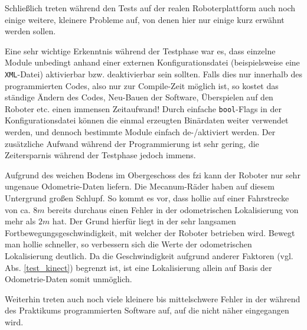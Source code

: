 Schließlich treten während den Tests auf der realen Roboterplattform auch noch einige weitere, kleinere Probleme auf, von denen hier nur einige kurz erwähnt werden sollen.

Eine sehr wichtige Erkenntnis während der Testphase war es, dass einzelne Module unbedingt anhand einer externen Konfigurationsdatei (beispielsweise eine \lstinline{XML}-Datei) aktivierbar bzw. deaktivierbar sein sollten.
Falls dies nur innerhalb des programmierten Codes, also nur zur Compile-Zeit möglich ist, so kostet das ständige Ändern des Codes, Neu-Bauen der Software, Überspielen auf den Roboter etc. einen immensen Zeitaufwand!
Durch einfache \lstinline{bool}-Flags in der Konfigurationsdatei können die einmal erzeugten Binärdaten weiter verwendet werden, und dennoch bestimmte Module einfach de-/aktiviert werden.
Der zusätzliche Aufwand während der Programmierung ist sehr gering, die Zeitersparnis während der Testphase jedoch immens.

Aufgrund des weichen Bodens im Obergeschoss des \gls{fzi} kann der Roboter nur sehr ungenaue Odometrie-Daten liefern.
Die Mecanum-Räder haben auf diesem Untergrund großen Schlupf.
So kommt es vor, dass \gls{hollie} auf einer Fahrstrecke von ca. $8m$ bereits durchaus einen Fehler in der odometrischen Lokalisierung von mehr als $2m$ hat.
Der Grund hierfür liegt in der sehr langsamen Fortbewegungsgeschwindigkeit, mit welcher der Roboter betrieben wird.
Bewegt man \gls{hollie} schneller, so verbessern sich die Werte der odometrischen Lokalisierung deutlich.
Da die Geschwindigkeit aufgrund anderer Faktoren (vgl. Abs. \ref{test_kinect}) begrenzt ist, ist eine Lokalisierung allein auf Basis der Odometrie-Daten somit unmöglich.

Weiterhin treten auch noch viele kleinere bis mittelschwere Fehler in der während des Praktikums programmierten Software auf, auf die nicht näher eingegangen wird.

